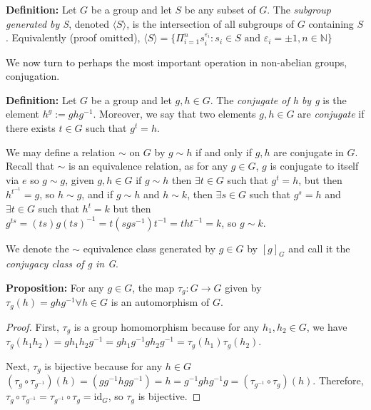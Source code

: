 \documentclass[12pt]{article}
\newcommand{\vs}{\vskip10pt}
\begin{document}
	\vs 
	
	\textbf{Definition: } Let $G$ be a group and let $S$ be any subset of $G$. The \textit{subgroup generated by S}, denoted $\langle S \rangle$, is the intersection of all subgroups of $G$ containing $S$. Equivalently (proof omitted), $\langle S \rangle = \{\Pi_{i=1}^n s_i^{\varepsilon_i} : s_i \in S \text{ and } \varepsilon_i = \pm 1, n \in \mathbb{N}\}$
	
	\vs 
	
	We now turn to perhaps the most important operation in non-abelian groups, conjugation. 
	
	\vs 
	
	\textbf{Definition: } Let $G$ be a group and let $g,h \in G$. The \textit{conjugate of h by g} is the element $h^g := ghg^{-1}$. Moreover, we say that two elements $g,h \in G$ are \textit{conjugate} if there exists $t \in G$ such that $g^t = h$. 
	
	\vs 
	
	We may define a relation $\sim$ on $G$ by $g \sim h$ if and only if $g,h$ are conjugate in $G$. Recall that $\sim$ is an equivalence relation, as for any $g \in G$, $g$ is conjugate to itself via $e$ so $g \sim g$, given $g,h \in G$ if $g \sim h$ then $\exists t \in G$ such that $g^t = h$, but then $h^{t^{-1}} = g$, so $h \sim g$, and if $g \sim h$ and $h \sim k$, then $\exists s \in G$ such that $g^s = h$ and $\exists t \in G$ such that $h^t = k$ but then $g^{ts} = (ts)g(ts)^{-1} = t(sgs^{-1})t^{-1} = tht^{-1} = k$, so $g \sim k$. 
	
	\vs 
	
	We denote the $\sim$ equivalence class generated by $g \in G$ by $[g]_G$ and call it the \textit{conjugacy class of g in G}. 
	
	\vs 
	
	\textbf{Proposition: } For any $g \in G$, the map $\tau_g: G \rightarrow G$ given by $\tau_g(h) = ghg^{-1} \forall h \in G$ is an automorphism of $G$. 
	
	\begin{proof}
		
		First, $\tau_g$ is a group homomorphism because for any $h_1, h_2 \in G$, we have $\tau_g(h_1 h_2) = g h_1 h_2 g^{-1} = g h_1 g^{-1} g h_2 g^{-1} = \tau_g(h_1) \tau_g(h_2)$. 
		
		\vs 
		
		Next, $\tau_g$ is bijective because for any $h \in G$ $(\tau_g \circ \tau_{g^{-1}}) (h) = (g g^{-1} h g g^{-1}) = h = g^{-1} g h g^{-1} g = (\tau_{g^{-1}} \circ \tau_{g}) (h)$. Therefore, $\tau_g \circ \tau_{g^{-1}} = \tau_{g^{-1}} \circ \tau_g = \text{id}_G$, so $\tau_g$ is bijective. 
		
	\end{proof}
	
\end{document}
